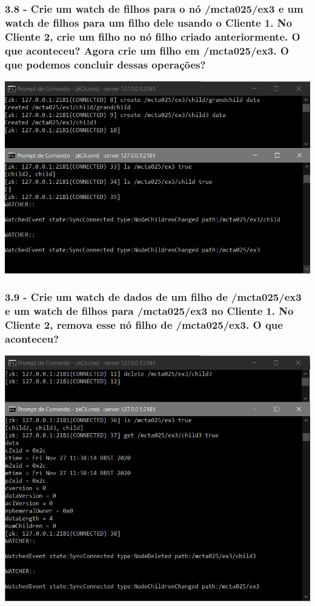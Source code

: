 \subsubsection{3.8 - Crie um watch de filhos para o nó /mcta025/ex3 e um watch de filhos para um filho dele usando o Cliente 1. No Cliente 2, crie um filho no
nó filho criado anteriormente. O que aconteceu? Agora crie um filho
em /mcta025/ex3. O que podemos concluir dessas operações?}

\includegraphics{pratica3/prints/roteiro 3.8.PNG}

\subsubsection{3.9 - Crie um watch de dados de um filho de /mcta025/ex3 e um watch de filhos para /mcta025/ex3 no Cliente 1. No Cliente 2, remova esse nó filho de /mcta025/ex3. O que aconteceu?}

\includegraphics{pratica3/prints/roteiro 3.9.PNG}

